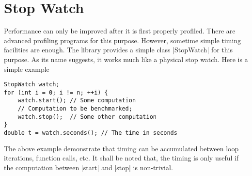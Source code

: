 \section{Stop Watch}
\label{sec:Stop Watch}

Performance can only be improved after it is first properly profiled. There are
advanced profiling programs for this purpose. However, sometime simple timing
facilities are enough. The library provides a simple class |StopWatch| for this
purpose. As its name suggests, it works much like a physical stop watch. Here
is a simple example
\begin{verbatim}
StopWatch watch;
for (int i = 0; i != n; ++i) {
    watch.start(); // Some computation
    // Computation to be benchmarked;
    watch.stop();  // Some other computation
}
double t = watch.seconds(); // The time in seconds
\end{verbatim}
The above example demonstrate that timing can be accumulated between loop
iterations, function calls, etc. It shall be noted that, the timing is only
useful if the computation between |start| and |stop| is non-trivial.
